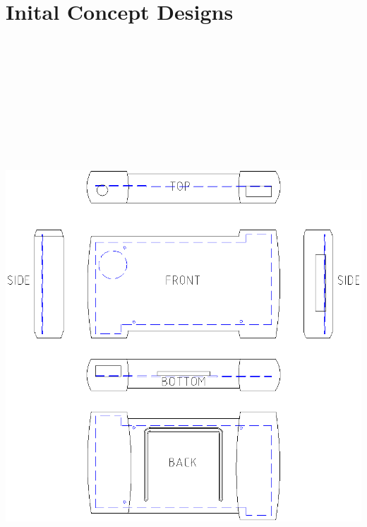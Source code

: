 
\chapter{Inital Concept Designs} %

\label{AppendixA} %

\clearpage

\includegraphics[width=14cm,height=23cm,keepaspectratio]{Figures/design1_sketch.png} \newline

